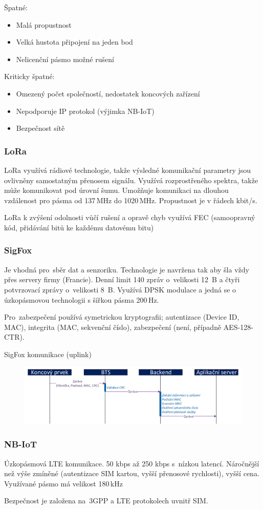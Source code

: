Špatné:
\begin{itemize}[noitemsep]
    \item Malá propustnost
    \item Velká hustota připojení na jeden bod
    \item Nelicenční pásmo možné rušení
\end{itemize}

Kriticky špatné:
\begin{itemize}[noitemsep]
    \item Omezený počet společností, nedostatek koncových zařízení
    \item Nepodporuje IP protokol (výjimka NB-IoT)
    \item Bezpečnost sítě
\end{itemize}

\subsubsection{LoRa}

LoRa využívá rádiové technologie, takže výsledné komunikační parametry jsou ovlivněny samostatným přenosem signálu.
Využívá rozprostřeného spektra, takže může komunikovat pod úrovní šumu.
Umožňuje komunikaci na dlouhou vzdálenost pro pásma od 137\,MHz do 1020\,MHz.
Propustnost je v řádech kbit/s.

LoRa k zvýšení odolnosti vůčí rušení a opravě chyb využívá FEC (samoopravný kód, přidávání bitů ke každému datovému bitu)


\subsubsection{SigFox}

Je vhodná pro~sběr dat a senzoriku.
Technologie je navržena tak aby šla vždy přes servery firmy (Francie).
Denní limit 140 zpráv o~velikosti 12~B a čtyři potvrzovací zprávy o~velikosti 8~B.
Využívá DPSK modulace a jedná se o úzkopásmovou technologii s šířkou pásma 200\,Hz.

Pro~zabezpečení používá symetrickou kryptografii; autentizace (Device ID, MAC), integrita (MAC, sekvenční číslo), zabezpečení (není, případně AES-128-CTR).


SigFox komunikace (uplink)

\begin{figure}[h]
    \centering
    \includegraphics[width=\textwidth]{images/100.png}
\end{figure}


\subsubsection{NB-IoT}

Úzkopásmová LTE komunikace.
50 kbps až 250 kbps s~nízkou latencí.
Náročnější než výše zmíněné (autentizace SIM kartou, vyšší přenosové rychlosti), vyšší cena.
Využívané pásmo má velikost 180\,kHz

Bezpečnost je založena na~3GPP a LTE protokolech uvnitř SIM.
